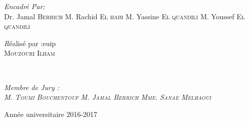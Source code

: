 \documentclass[a4paper, 12pt]{report}
\begin{document}
\begin{titlepage}

\begin{minipage}{0.4\textwidth}
\begin {flushleft}
 \large
\emph{Encadré Par:} \\
Dr. Jamal \textsc{Berrich} %
\newline
M. Rachid \textsc{El habi} %
\newline
M. Yassine  \textsc{El quandili} %
\newline
M. Youssef \textsc{El quandili} %
\end{flushleft}
\end{minipage}
\begin{minipage}{0.4\textwidth}
\begin{flushright}
 \large
\emph Réalisé par :\textcolor[rgb]{1,1,0.88}{euip }\\
\textsc{Mouzouri Ilham} %
\end{flushright}
\end{minipage}
\\[4cm]
\begin{flushleft}
\begin{minipage}{0.4\textwidth}{}
 \large
\emph{Membre de Jury :}\\
\emph {\textsc{M. Toumi Bouchentouf}} 
\newline
\emph{\textsc{M. Jamal Berrich}}
\newline
\emph{\textsc{Mme. Sanae Melhaoui}}
\end{minipage}
\end{flushleft}


{\large Année universitaire 2016-2017}\\[3cm] %


 

\vfill %

\end{titlepage}
\end{document}
